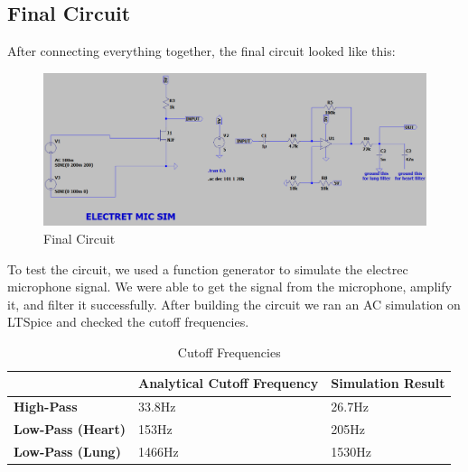 \newpage
\thispagestyle{plain}

\subsection{Final Circuit}

After connecting everything together, the final circuit looked like this:

\begin{figure}[h]
    \centering
    \includegraphics[width=1\textwidth]{assets/final-circuit.png}
    \caption{Final Circuit}
    \label{fig:final_circuit}
\end{figure}

To test the circuit, we used a function generator to simulate the electrec microphone signal. We were able to get the signal from the microphone, amplify it, and filter it successfully. After building the circuit we ran an AC simulation on LTSpice and checked the cutoff frequencies.

\begin{table}[h]
    \begin{tabular}{l|l|l|}
    \cline{2-3}
                                                    & \textbf{Analytical Cutoff Frequency} & \textbf{Simulation Result} \\ \hline
    \multicolumn{1}{|l|}{\textbf{High-Pass}}        & 33.8Hz                               & 26.7Hz                     \\ \hline
    \multicolumn{1}{|l|}{\textbf{Low-Pass (Heart)}} & 153Hz                                & 205Hz                      \\ \hline
    \multicolumn{1}{|l|}{\textbf{Low-Pass (Lung)}}  & 1466Hz                               & 1530Hz                     \\ \hline
    \end{tabular}
    \caption{Cutoff Frequencies}
    \label{tab:cutoff_frequencies}
\end{table}

